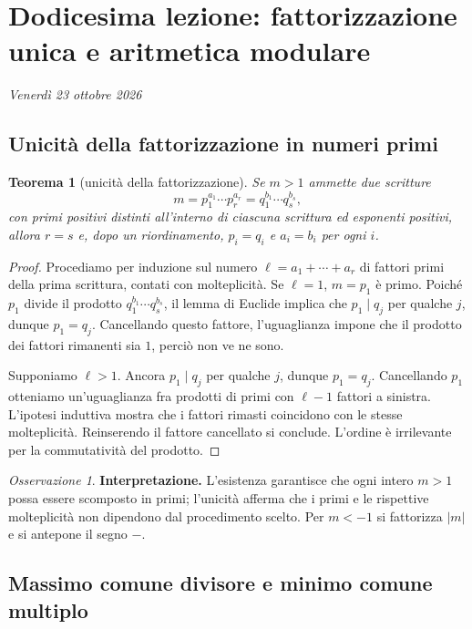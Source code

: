 \documentclass[11pt,a4paper]{article}
\theoremstyle{definition}
\theoremstyle{plain}
\newtheorem{teorema}[definizione]{Teorema}
\theoremstyle{remark}
\newtheorem*{osservazione}{Osservazione}
\begin{document}
\section{Dodicesima lezione: fattorizzazione unica e aritmetica modulare}
\textit{Venerdì 23 ottobre 2026}

\subsection{Unicità della fattorizzazione in numeri primi}

\begin{teorema}[unicità della fattorizzazione]
Se $m>1$ ammette due scritture
\[
m=p_1^{a_1}\cdots p_r^{a_r}=q_1^{b_1}\cdots q_s^{b_s},
\]
con primi positivi distinti all'interno di ciascuna scrittura ed esponenti positivi, allora $r=s$ e, dopo un riordinamento, $p_i=q_i$ e $a_i=b_i$ per ogni $i$.
\end{teorema}
\begin{proof}
Procediamo per induzione sul numero $\ell=a_1+\cdots+a_r$ di fattori primi della prima scrittura, contati con molteplicità. Se $\ell=1$, $m=p_1$ è primo. Poiché $p_1$ divide il prodotto $q_1^{b_1}\cdots q_s^{b_s}$, il lemma di Euclide implica che $p_1\mid q_j$ per qualche $j$, dunque $p_1=q_j$. Cancellando questo fattore, l'uguaglianza impone che il prodotto dei fattori rimanenti sia $1$, perciò non ve ne sono.

Supponiamo $\ell>1$. Ancora $p_1\mid q_j$ per qualche $j$, dunque $p_1=q_j$. Cancellando $p_1$ otteniamo un'uguaglianza fra prodotti di primi con $\ell-1$ fattori a sinistra. L'ipotesi induttiva mostra che i fattori rimasti coincidono con le stesse molteplicità. Reinserendo il fattore cancellato si conclude. L'ordine è irrilevante per la commutatività del prodotto.
\end{proof}

\begin{osservazione}
\textbf{Interpretazione.} L'esistenza garantisce che ogni intero $m>1$ possa essere scomposto in primi; l'unicità afferma che i primi e le rispettive molteplicità non dipendono dal procedimento scelto. Per $m< -1$ si fattorizza $|m|$ e si antepone il segno $-$.
\end{osservazione}

\subsection{Massimo comune divisore e minimo comune multiplo}
\end{document}
